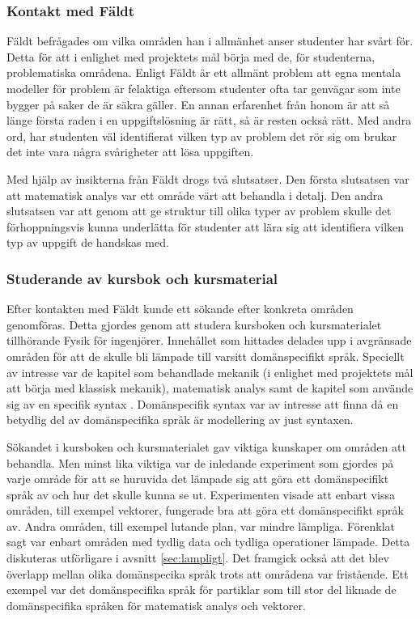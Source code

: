 \begin{draft}
\subsubsection{Kontakt med Fäldt}
\label{sec:kontakt_faldt}

Fäldt befrågades om vilka områden han i allmänhet anser studenter har
svårt för. Detta för att i enlighet med projektets mål börja med de, för
studenterna, problematiska områdena. Enligt Fäldt är ett allmänt problem att
egna mentala modeller för problem är felaktiga eftersom studenter ofta tar
genvägar som inte bygger på saker de är säkra gäller. En annan erfarenhet
från honom är att så länge första raden i en uppgiftslösning är rätt, så är
resten också rätt. Med andra ord, har studenten väl identifierat vilken typ av
problem det rör sig om brukar det inte vara några svårigheter att lösa
uppgiften.

Med hjälp av insikterna från Fäldt drogs två slutsatser. Den första slutsatsen
var att matematisk analys var ett område värt att behandla i detalj. Den andra
slutsatsen var att genom att ge struktur till olika typer av problem skulle det
förhoppningsvis kunna underlätta för studenter att lära sig att identifiera vilken
typ av uppgift de handskas med.

\subsubsection{Studerande av kursbok och kursmaterial}

Efter kontakten med Fäldt kunde ett sökande efter konkreta områden genomföras. Detta gjordes genom att studera kursboken och kursmaterialet tillhörande Fysik för ingenjörer. Innehållet som hittades delades upp i avgränsade områden för att de skulle bli lämpade till varsitt domänspecifikt språk. Speciellt av intresse var de kapitel som behandlade mekanik (i enlighet med projektets mål att börja med klassisk mekanik), matematisk analys samt de kapitel som använde sig av en specifik syntax . Domänspecifik syntax var av intresse att finna då en betydlig del av domänspecifika språk är modellering av just syntaxen. 

Sökandet i kursboken och kursmaterialet gav viktiga kunskaper om områden att behandla. Men minst lika viktiga var de inledande experiment som gjordes på varje område för att se huruvida det lämpade sig att göra ett domänspecifikt språk av och hur det skulle kunna se ut. Experimenten visade att enbart vissa områden, till exempel vektorer, fungerade bra att göra ett domänspecifikt språk av. Andra områden, till exempel lutande plan, var mindre lämpliga. Förenklat sagt var enbart områden med tydlig data och tydliga operationer lämpade. Detta diskuteras utförligare i avsnitt \ref{sec:lampligt}. Det framgick också att det blev överlapp mellan olika domänspecika språk trots att områdena var fristående. Ett exempel var det domänspecifika språk för partiklar som till stor del liknade de domänspecifika språken för matematisk analys och vektorer.


\end{draft}
